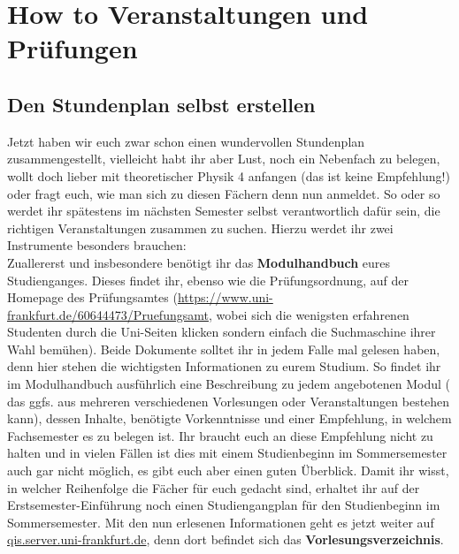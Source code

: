 \section{How to Veranstaltungen und Prüfungen}
\label{sec:how_to_veranstaltungen_prüfungen}
\subsection{Den Stundenplan selbst erstellen}
\label{subsec:stundenplan_erstellen}
Jetzt haben wir euch zwar schon einen wundervollen Stundenplan zusammengestellt, vielleicht habt ihr aber Lust, noch ein Nebenfach zu belegen, wollt doch lieber mit theoretischer Physik 4 anfangen (das ist keine Empfehlung!) oder fragt euch, wie man sich zu diesen Fächern denn nun anmeldet. So oder so werdet ihr spätestens im nächsten Semester selbst verantwortlich dafür sein, die richtigen Veranstaltungen zusammen zu suchen. Hierzu werdet ihr zwei Instrumente besonders brauchen:\\
Zuallererst und insbesondere benötigt ihr das \textbf{Modulhandbuch} eures Studienganges. Dieses findet ihr, ebenso wie die Prüfungsordnung, auf der Homepage des Prüfungsamtes (\url{https://www.uni-frankfurt.de/60644473/Pruefungsamt}, wobei sich die wenigsten erfahrenen Studenten durch die Uni-Seiten klicken sondern einfach die Suchmaschine ihrer Wahl bemühen). Beide Dokumente solltet ihr in jedem Falle mal gelesen haben, denn hier stehen die wichtigsten Informationen zu eurem Studium. So findet ihr im Modulhandbuch ausführlich eine Beschreibung zu jedem angebotenen Modul ( das ggfs. aus mehreren verschiedenen Vorlesungen oder Veranstaltungen bestehen kann), dessen Inhalte, benötigte Vorkenntnisse und einer Empfehlung, in welchem Fachsemester es zu belegen ist. Ihr braucht euch an diese Empfehlung nicht zu halten und in vielen Fällen ist dies mit einem Studienbeginn im Sommersemester auch gar nicht möglich, es gibt euch aber einen guten Überblick. Damit ihr wisst, in welcher Reihenfolge die Fächer für euch gedacht sind, erhaltet ihr auf der Erstsemester-Einführung noch einen Studiengangplan für den Studienbeginn im Sommersemester. Mit den nun erlesenen Informationen geht es jetzt weiter auf \url{qis.server.uni-frankfurt.de}, denn dort befindet sich das \textbf{Vorlesungsverzeichnis}.\\
